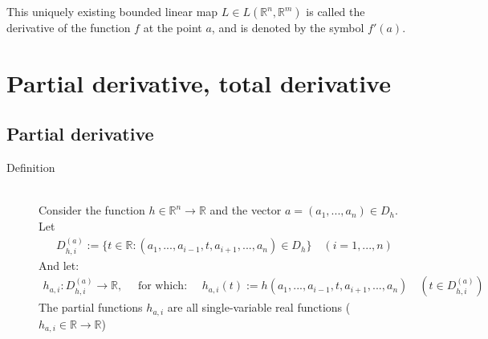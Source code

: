 \documentclass[margin=0px]{article}
\newcommand{\R}{\mathbb{R}}
\begin{document}
\begin{description}
        This uniquely existing bounded linear map $L \in L(\R^n,\R^m) $ is called the derivative of the function $f$ at the point $a$, and is denoted by the symbol $f'(a)$.
\end{description}

\section{Partial derivative, total derivative}
\subsection{Partial derivative}
\begin{description}
    \item[Definition] \hfill \\
        Consider the function $ h \in \R^n \rightarrow \R $ and the vector $a = (a_1, ... , a_n) \in D_h $. Let
        \begin{align*}
            D_{h,i}^{(a)} := \{t \in \R : (a_1, ..., a_{i-1}, t, a_{i+1}, ..., a_n) \in D_h\} \quad (i = 1,...,n)
        \end{align*}
        And let:
        \begin{align*}
            h_{a,i} : D_{h,i}^{(a)} \rightarrow \R, \quad \textrm{ for which: } \quad h_{a,i}(t) := h(a_1, ..., a_{i-1}, t, a_{i+1}, ..., a_n) \quad (t\in	D_{h,i}^{(a)} )
        \end{align*}
        The partial functions $h_{a,i}$ are all single-variable real functions ($h_{a,i} \in \R \rightarrow\R $)


\end{description}
\end{document}
